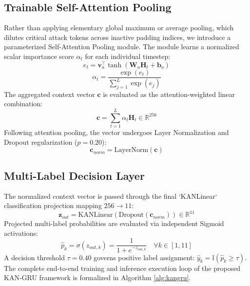 \documentclass[conference]{IEEEtran}
\begin{document}
\subsection{Trainable Self-Attention Pooling}
Rather than applying elementary global maximum or average pooling, which dilutes critical attack tokens across inactive padding indices, we introduce a parameterized Self-Attention Pooling module. The module learns a normalized scalar importance score $\alpha_t$ for each individual timestep:
\begin{equation}
    e_t = \mathbf{v}_a^\top \tanh(\mathbf{W}_a \mathbf{H}_t + \mathbf{b}_a)
\end{equation}
\begin{equation}
    \alpha_t = \frac{\exp(e_t)}{\sum_{j=1}^{L} \exp(e_j)}
\end{equation}
The aggregated context vector $\mathbf{c}$ is evaluated as the attention-weighted linear combination:
\begin{equation}
    \mathbf{c} = \sum_{t=1}^{L} \alpha_t \mathbf{H}_t \in \mathbb{R}^{256}
\end{equation}
Following attention pooling, the vector undergoes Layer Normalization and Dropout regularization ($p=0.20$):
\begin{equation}
    \mathbf{c}_{norm} = \text{LayerNorm}(\mathbf{c})
\end{equation}

\subsection{Multi-Label Decision Layer}
The normalized context vector is passed through the final `KANLinear` classification projection mapping $256 \to 11$:
\begin{equation}
    \mathbf{z}_{out} = \text{KANLinear}(\text{Dropout}(\mathbf{c}_{norm})) \in \mathbb{R}^{11}
\end{equation}
Projected multi-label probabilities are evaluated via independent Sigmoid activations:
\begin{equation}
    \hat{p}_k = \sigma(z_{out, k}) = \frac{1}{1 + e^{-z_{out, k}}} \quad \forall k \in [1, 11]
\end{equation}
A decision threshold $\tau = 0.40$ governs positive label assignment: $\hat{y}_k = \mathbb{I}(\hat{p}_k \ge \tau)$. The complete end-to-end training and inference execution loop of the proposed KAN-GRU framework is formalized in Algorithm \ref{alg:kangru}.
\end{document}

